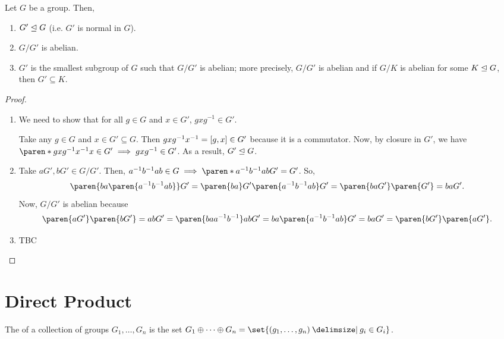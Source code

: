 \documentclass[11pt]{penrose}
\begin{document}
\begin{nthm}
    Let $G$ be a group. Then,
    \begin{enumerate}
        \item $G' \mathrel{\trianglelefteq} G$ (i.e. $G'$ is normal in $G$).
        \item $G / G'$ is abelian.
        \item $G'$ is the smallest subgroup of $G$ such that $G/G'$ is abelian; more precisely, $G/G'$ is abelian and if $G / K$ is abelian for some $K \mathrel{\trianglelefteq} G$, then $G' \subseteq K$.
    \end{enumerate}
\end{nthm}
\begin{proof}
    \phantom{}
    \begin{enumerate}
        \item We need to show that for all $g \in G$ and $x \in G'$, $g x g^{-1} \in G'$.

        Take any $g \in G$ and $x \in G' \subseteq G$. Then $g x g^{-1} x^{-1} = \lbrack g, x\rbrack \in G'$ because it is a commutator. Now, by closure in $G'$, we have
        $\paren*{ g x g^{-1} x^{-1} } x \in G' \implies g x g^{-1} \in G'$. As a result, $G' \mathrel{\trianglelefteq} G$.

        \item Take $aG', bG' \in G/G'$. Then, $a^{-1}b^{-1}ab \in G \implies \paren*{a^{-1}b^{-1}ab} G' = G'$. So,
        \begin{equation*}
            \paren{ba\paren{a^{-1}b^{-1}ab}} G' = \paren{ba} G' \paren{a^{-1}b^{-1}ab} G' = \paren{ba G'} \paren{G'} = ba G'.
        \end{equation*}
        Now, $G/G'$ is abelian because
        \begin{equation*}
            \paren{aG'} \paren{bG'} = ab G' = \paren{baa^{-1}b^{-1}}ab G' = ba\paren{a^{-1}b^{-1}ab} G' = ba G' = \paren{bG'} \paren{aG'}.
        \end{equation*}

        \item TBC
    \end{enumerate}
\end{proof}


\section{Direct Product}

\begin{ndfn}
    The  of a collection of groups $G_{1}, \dots, G_{n}$ is the set $G_{1} \oplus \dots \oplus G_{n} = \set{ (g_{1}, \dots, g_{n}) \st g_{i} \in G_{i} }$.
\end{ndfn}
\end{document}
